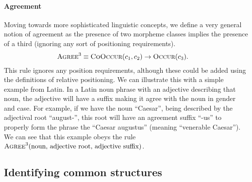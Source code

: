 \paragraph{Agreement}
Moving towards more sophisticated linguistic concepts, we define a very general notion of agreement as the presence of two morpheme classes implies the presence of a third (ignoring any sort of positioning requirements).
\begin{align}
  \textsc{Agree}^3 &\equiv \textsc{CoOccur}(c_1, c_2) \rightarrow \textsc{Occur}(c_3)
  .
\end{align}
This rule ignores any position requirements, although these could be added using the definitions of relative positioning.
We can illustrate this with a simple example from Latin.
In a Latin noun phrase with an adjective describing that noun, the adjective will have a suffix making it agree with the noun in gender and case.
For example, if we have the noun ``Caesar'', being described by the adjectival root ``august-'', this root will have an agreement suffix ``-us'' to properly form the phrase the ``Caesar augustus'' (meaning ``venerable Caesar'').
We can see that this example obeys the rule $\textsc{Agree}^3(\text{noun}, \,\text{adjective root},\,\text{adjective suffix})$.




\subsection{Identifying common structures}

